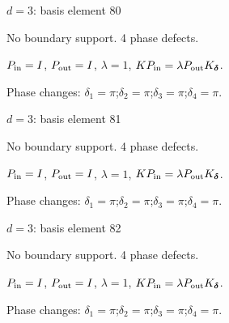 \newpage
{}
{\Large $d=3$: basis element 80}\par
No boundary support. 4 phase defects.
\begin{center}
\end{center}
\vspace{-1mm}
$P_{\rm in}=I$, \quad $P_{\rm out}=I$, \quad $\lambda=1$, \qquad $K P_{\rm in}=\lambda P_{\rm out}K_{\boldsymbol\delta}$.
\par\smallskip\begin{minipage}{.98\linewidth}\small Phase changes: $\delta_{1}=\pi$;\quad $\delta_{2}=\pi$;\quad $\delta_{3}=\pi$;\quad $\delta_{4}=\pi$.\end{minipage}
\vfill
{\footnotesize\texttt{}}
\newpage
{}
{\Large $d=3$: basis element 81}\par
No boundary support. 4 phase defects.
\begin{center}
\end{center}
\vspace{-1mm}
$P_{\rm in}=I$, \quad $P_{\rm out}=I$, \quad $\lambda=1$, \qquad $K P_{\rm in}=\lambda P_{\rm out}K_{\boldsymbol\delta}$.
\par\smallskip\begin{minipage}{.98\linewidth}\small Phase changes: $\delta_{1}=\pi$;\quad $\delta_{2}=\pi$;\quad $\delta_{3}=\pi$;\quad $\delta_{4}=\pi$.\end{minipage}
\vfill
{\footnotesize\texttt{}}
\newpage
{}
{\Large $d=3$: basis element 82}\par
No boundary support. 4 phase defects.
\begin{center}
\end{center}
\vspace{-1mm}
$P_{\rm in}=I$, \quad $P_{\rm out}=I$, \quad $\lambda=1$, \qquad $K P_{\rm in}=\lambda P_{\rm out}K_{\boldsymbol\delta}$.
\par\smallskip\begin{minipage}{.98\linewidth}\small Phase changes: $\delta_{1}=\pi$;\quad $\delta_{2}=\pi$;\quad $\delta_{3}=\pi$;\quad $\delta_{4}=\pi$.\end{minipage}
\vfill
{\footnotesize\texttt{}}
\newpage
{}
